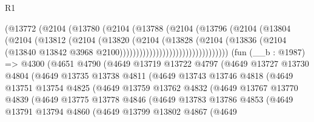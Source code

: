 \begin{lexlean}{R1}
\begin{coremodule}
                                (@13772
                                  (@2104
                                    (@13780
                                      (@2104
                                        (@13788
                                          (@2104
                                            (@13796
                                              (@2104
                                                (@13804
                                                  (@2104
                                                    (@13812
                                                      (@2104
                                                        (@13820
                                                          (@2104
                                                            (@13828
                                                              (@2104
                                                                (@13836
                                                                  (@2104
                                                                    (@13840
                                                                      @13842
                                                                      @3968
                                                                      @2100)))))))))))))))))))))))))))))))))
    (fun (__b : @1987) =>
    @4300
      (@4651
        @4790
        (@4649
          @13719
          @13722
          @4797
          (@4649
            @13727
            @13730
            @4804
            (@4649
              @13735
              @13738
              @4811
              (@4649
                @13743
                @13746
                @4818
                (@4649
                  @13751
                  @13754
                  @4825
                  (@4649
                    @13759
                    @13762
                    @4832
                    (@4649
                      @13767
                      @13770
                      @4839
                      (@4649
                        @13775
                        @13778
                        @4846
                        (@4649
                          @13783
                          @13786
                          @4853
                          (@4649
                            @13791
                            @13794
                            @4860
                            (@4649
                              @13799
                              @13802
                              @4867
                              (@4649

\end{coremodule}
\end{lexlean}
